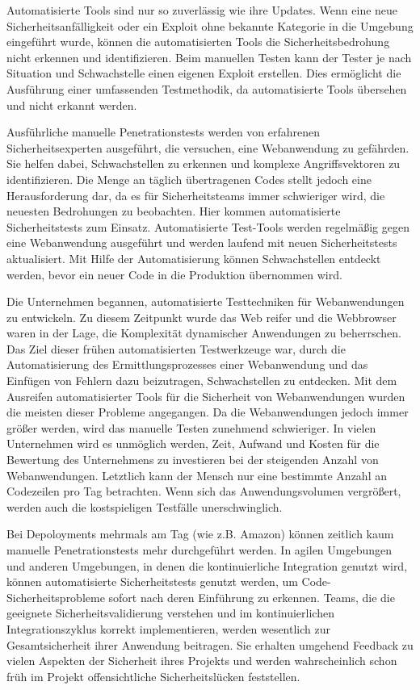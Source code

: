 Automatisierte Tools sind nur so zuverlässig wie ihre Updates. Wenn eine neue Sicherheitsanfälligkeit oder ein Exploit ohne bekannte Kategorie in die Umgebung eingeführt wurde, können die automatisierten Tools die Sicherheitsbedrohung nicht erkennen und identifizieren. Beim manuellen Testen kann der Tester je nach Situation und Schwachstelle einen eigenen Exploit erstellen. Dies ermöglicht die Ausführung einer umfassenden Testmethodik, da automatisierte Tools übersehen und nicht erkannt werden\cite{packetlabs18}.

Ausführliche manuelle Penetrationstests werden von erfahrenen Sicherheitsexperten ausgeführt, die versuchen, eine Webanwendung zu gefährden. Sie helfen dabei, Schwachstellen zu erkennen und komplexe Angriffsvektoren zu identifizieren. Die Menge an täglich übertragenen Codes stellt jedoch eine Herausforderung dar, da es für Sicherheitsteams immer schwieriger wird, die neuesten Bedrohungen zu beobachten. Hier kommen automatisierte Sicherheitstests zum Einsatz. Automatisierte Test-Tools werden regelmäßig gegen eine Webanwendung ausgeführt und werden laufend mit neuen Sicherheitstests aktualisiert. Mit Hilfe der Automatisierung können Schwachstellen entdeckt werden, bevor ein neuer Code in die Produktion übernommen wird\cite{wmpta17}.

Die Unternehmen begannen, automatisierte Testtechniken für Webanwendungen zu entwickeln. Zu diesem Zeitpunkt wurde das Web reifer und die Webbrowser waren in der Lage, die Komplexität dynamischer Anwendungen zu beherrschen. Das Ziel dieser frühen automatisierten Testwerkzeuge war, durch die Automatisierung des Ermittlungsprozesses einer Webanwendung und das Einfügen von Fehlern dazu beizutragen, Schwachstellen zu entdecken. Mit dem Ausreifen automatisierter Tools für die Sicherheit von Webanwendungen wurden die meisten dieser Probleme angegangen. Da die Webanwendungen jedoch immer größer werden, wird das manuelle Testen zunehmend schwieriger. In vielen Unternehmen wird es unmöglich werden, Zeit, Aufwand und Kosten für die Bewertung des Unternehmens zu investieren bei der steigenden Anzahl von Webanwendungen. Letztlich kann der Mensch nur eine bestimmte Anzahl an Codezeilen pro Tag betrachten. Wenn sich das Anwendungsvolumen vergrößert, werden auch die kostspieligen Testfälle unerschwinglich\cite[2--5]{wasasibm08}.

Bei Depoloyments mehrmals am Tag (wie z.B. Amazon)
können zeitlich kaum manuelle Penetrationstests mehr durchgeführt werden.
In agilen Umgebungen und anderen Umgebungen, in denen die kontinuierliche Integration genutzt wird, können automatisierte Sicherheitstests genutzt werden, um Code-Sicherheitsprobleme sofort nach deren Einführung zu erkennen. Teams, die die geeignete Sicherheitsvalidierung verstehen und im kontinuierlichen Integrationszyklus korrekt implementieren, werden wesentlich zur Gesamtsicherheit ihrer Anwendung beitragen. Sie erhalten umgehend Feedback zu vielen Aspekten der Sicherheit ihres Projekts und werden wahrscheinlich schon früh im Projekt offensichtliche Sicherheitslücken feststellen\cite{cicdandreassmith18}.

